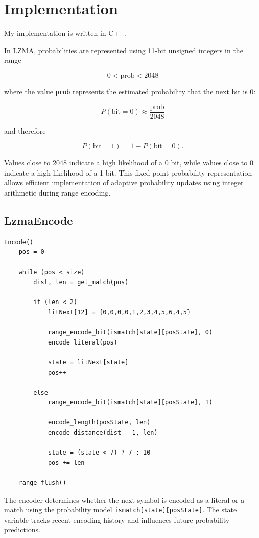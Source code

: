 \section{Implementation}

My implementation is written in C++.

In LZMA, probabilities are represented using 11-bit unsigned integers in the range

\[
0 < \text{prob} < 2048
\]

where the value \texttt{prob} represents the estimated probability that the next bit is 0:

\[
P(\text{bit}=0) \approx \frac{\text{prob}}{2048}
\]

and therefore

\[
P(\text{bit}=1) = 1 - P(\text{bit}=0).
\]

Values close to 2048 indicate a high likelihood of a 0 bit, while values close to 0 indicate a high likelihood of a 1 bit. This fixed-point probability representation allows efficient implementation of adaptive probability updates using integer arithmetic during range encoding.

\subsection{LzmaEncode}

\begin{Verbatim}[frame=single,fontsize=\footnotesize]
Encode()
    pos = 0
    
    while (pos < size)
        dist, len = get_match(pos)

        if (len < 2)
            litNext[12] = {0,0,0,0,1,2,3,4,5,6,4,5}

            range_encode_bit(ismatch[state][posState], 0)
            encode_literal(pos)

            state = litNext[state]
            pos++

        else
            range_encode_bit(ismatch[state][posState], 1)

            encode_length(posState, len)
            encode_distance(dist - 1, len)

            state = (state < 7) ? 7 : 10
            pos += len

    range_flush()
\end{Verbatim}

The encoder determines whether the next symbol is encoded as a literal or a match using the probability model \texttt{ismatch[state][posState]}. The state variable tracks recent encoding history and influences future probability predictions.

